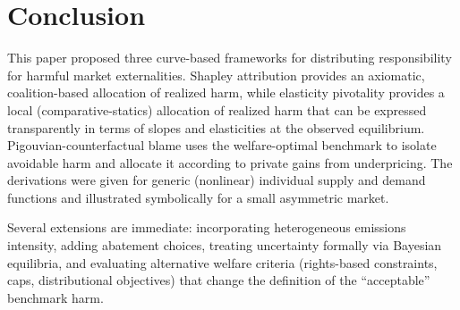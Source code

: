 \documentclass[journal, a4paper]{IEEEtran}
\begin{document}
\section{Conclusion}
This paper proposed three curve-based frameworks for distributing responsibility for harmful market externalities. Shapley attribution provides an axiomatic, coalition-based allocation of realized harm, while elasticity pivotality provides a local (comparative-statics) allocation of realized harm that can be expressed transparently in terms of slopes and elasticities at the observed equilibrium. Pigouvian-counterfactual blame uses the welfare-optimal benchmark to isolate avoidable harm and allocate it according to private gains from underpricing. The derivations were given for generic (nonlinear) individual supply and demand functions and illustrated symbolically for a small asymmetric market.

Several extensions are immediate: incorporating heterogeneous emissions intensity, adding abatement choices, treating uncertainty formally via Bayesian equilibria, and evaluating alternative welfare criteria (rights-based constraints, caps, distributional objectives) that change the definition of the ``acceptable'' benchmark harm.


% 
\end{document}
